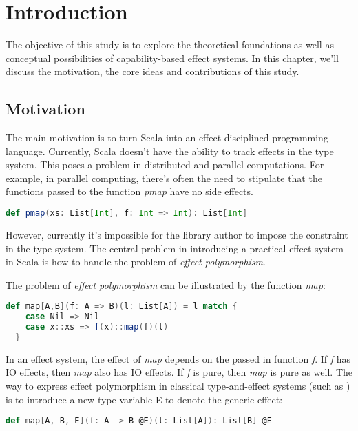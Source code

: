 \section{Introduction}

The objective of this study is to explore the theoretical foundations
as well as conceptual possibilities of capability-based effect
systems. In this chapter, we'll discuss the motivation, the core ideas
and contributions of this study.

\subsection{Motivation}

The main motivation is to turn Scala into an effect-disciplined
programming language. Currently, Scala doesn't have the ability to
track effects in the type system. This poses a problem in distributed
and parallel computations. For example, in parallel computing, there's
often the need to stipulate that the functions passed to the function
\emph{pmap} have no side effects.

\begin{lstlisting}[language=Scala]
def pmap(xs: List[Int], f: Int => Int): List[Int]
\end{lstlisting}

However, currently it's impossible for the library author to impose
the constraint in the type system. The central problem in introducing
a practical effect system in Scala is how to handle the problem of
\emph{effect polymorphism}.

The problem of \emph{effect polymorphism} can be illustrated by the
function \emph{map}:

\begin{lstlisting}[language=Scala]
  def map[A,B](f: A => B)(l: List[A]) = l match {
    case Nil => Nil
    case x::xs => f(x)::map(f)(l)
  }
\end{lstlisting}

In an effect system, the effect of \emph{map} depends on the passed in
function \emph{f}. If \emph{f} has IO effects, then \emph{map} also
has IO effects. If \emph{f} is pure, then \emph{map} is pure as
well. The way to express effect polymorphism in classical
type-and-effect systems (such as \cite{lucassen1988polymorphic}) is to
introduce a new type variable E to denote the generic effect:

\begin{lstlisting}[language=Scala]
def map[A, B, E](f: A -> B @E)(l: List[A]): List[B] @E
\end{lstlisting}

